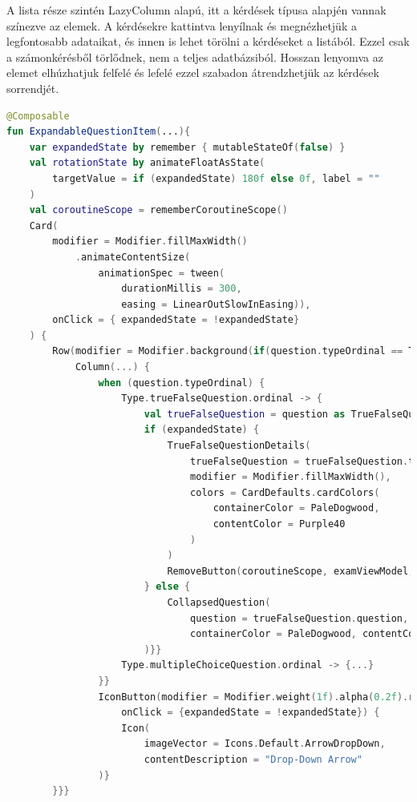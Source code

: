 A lista része szintén LazyColumn alapú, itt a kérdések típusa alapjén vannak színezve az elemek.
A kérdésekre kattintva lenyílnak és megnézhetjük a legfontosabb adataikat, és innen is lehet törölni a kérdéseket a listából. Ezzel csak a számonkérésből törlődnek, nem a teljes adatbázsiból.
Hosszan lenyomva az elemet elhúzhatjuk felfelé és lefelé ezzel szabadon átrendzhetjük az kérdések sorrendjét.

\begin{lstlisting}[caption={Kinyitható kérdés megvalósítása.}, label={lst:DetailsScreen}, language=Kotlin]
@Composable
fun ExpandableQuestionItem(...){
    var expandedState by remember { mutableStateOf(false) }
    val rotationState by animateFloatAsState(
        targetValue = if (expandedState) 180f else 0f, label = ""
    )
    val coroutineScope = rememberCoroutineScope()
    Card(
        modifier = Modifier.fillMaxWidth()
            .animateContentSize(
                animationSpec = tween(
                    durationMillis = 300,
                    easing = LinearOutSlowInEasing)),
        onClick = { expandedState = !expandedState}
    ) {
        Row(modifier = Modifier.background(if(question.typeOrdinal == Type.trueFalseQuestion.ordinal) PaleDogwood else Green)) {
            Column(...) {
                when (question.typeOrdinal) {
                    Type.trueFalseQuestion.ordinal -> {
                        val trueFalseQuestion = question as TrueFalseQuestionDto
                        if (expandedState) {
                            TrueFalseQuestionDetails(
                                trueFalseQuestion = trueFalseQuestion.toTrueFalseQuestionDetails(...),
                                modifier = Modifier.fillMaxWidth(),
                                colors = CardDefaults.cardColors(
                                    containerColor = PaleDogwood,
                                    contentColor = Purple40
                                )
                            )
                            RemoveButton(coroutineScope, examViewModel, question)
                        } else {
                            CollapsedQuestion(
                                question = trueFalseQuestion.question,
                                containerColor = PaleDogwood, contentColor = Purple40
                        )}}
                    Type.multipleChoiceQuestion.ordinal -> {...}
                }}
                IconButton(modifier = Modifier.weight(1f).alpha(0.2f).rotate(rotationState),
                    onClick = {expandedState = !expandedState}) {
                    Icon(
                        imageVector = Icons.Default.ArrowDropDown,
                        contentDescription = "Drop-Down Arrow"
                )}
        }}}
\end{lstlisting}

